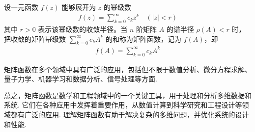             \par 设一元函数 $f(z)$ 能够展开为 $z$ 的幂级数 
            \begin{align*}
                f(z) = \sum_{k=0}^{\infty}c_kz^k \quad (|z| < r)
            \end{align*}
            其中 $r > 0$ 表示该幂级数的收敛半径。当 $n$ 阶矩阵 $A$ 的谱半径 $\rho(A) < r$ 时，把收敛的矩阵幂级数 $\sum_{k=0}^{\infty}c_kA^k$ 的和称为矩阵函数，记为 $f(A)$，即
            \begin{align*}
                f(A) = \sum_{k=0}^{\infty}c_kA^k \tag{3.3.2}
            \end{align*}
            \par 矩阵函数在多个领域中具有广泛的应用，包括但不限于数值分析、微分方程求解、量子力学、机器学习和数据分析、信号处理等方面.
            \par 总之，矩阵函数是数学和工程领域中的一个关键工具，用于处理和分析多维数据和系统. 它们在各种应用中发挥着重要作用，从数值计算到科学研究和工程设计等领域都有广泛的应用. 理解矩阵函数有助于解决复杂的多维问题，并优化系统的设计和性能.

